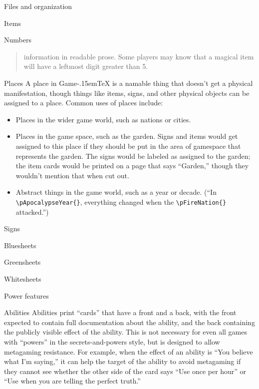 \documentclass[11pt]{article}
\def\gametex{\mbox{Game\kern-.15em\TeX}}
\begin{document}
\begin{section}{Files and organization}
\begin{subsection}{Items}
\begin{subsubsection}{Numbers}
\begin{quote}
information in readable prose. Some players may know that a magical item will have a
leftmost digit greater than 5.
\end{quote}
\end{subsubsection}
\end{subsection}
\begin{subsection}{Places}
A place in \gametex{} is a namable thing that doesn't get a physical manifestation, though things like
items, signs, and other physical objects can be assigned to a place.  Common uses of places include:

\begin{itemize}
\item Places in the wider game world, such as nations or cities.
\item Places in the game space, such as the garden.  Signs and items would get assigned to this place if they should be put in the area of gamespace that represents the garden.  The signs would be labeled as assigned to the garden; 
the item cards would be printed on a page that says ``Garden,'' though they wouldn't mention that when cut out.
\item Abstract things in the game world, such as a year or decade.  (``In \lstinline|\pApocalypseYear{}|, everything changed when the \lstinline|\pFireNation{}| attacked.'')
\end{itemize}
\end{subsection}
\begin{subsection}{Signs}
\end{subsection}
\begin{subsection}{Bluesheets}
\end{subsection}
\begin{subsection}{Greensheets}
\end{subsection}
\begin{subsection}{Whitesheets}
\end{subsection}
\begin{subsection}{Power features}
\begin{subsubsection}{Abilities}
Abilities print ``cards'' that have a front and a back, with the front expected to contain full documentation about the ability, and the back containing the publicly visible effect of the ability.  This is not necessary for even all games with ``powers'' in the secrets-and-powers style, but is designed to allow metagaming resistance.  For example, when the effect of an ability is ``You believe what I'm saying,'' it can help the target of the ability to avoid metagaming if they cannot see whether the other side of the card says ``Use once per hour'' or ``Use when you are telling the perfect truth.''

\end{subsubsection}
\end{subsection}
\end{section}
\end{document}
